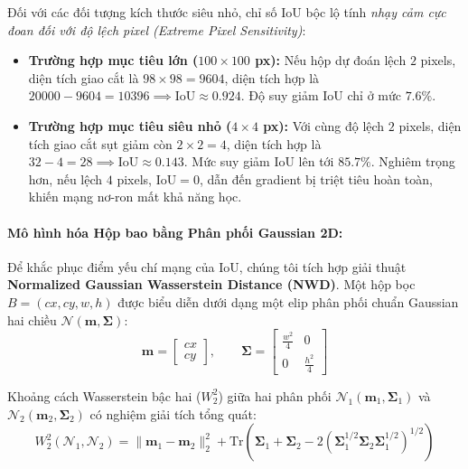 \documentclass[11pt,a4paper]{article}
\begin{document}
Đối với các đối tượng kích thước siêu nhỏ, chỉ số IoU bộc lộ tính \textit{nhạy cảm cực đoan đối với độ lệch pixel (Extreme Pixel Sensitivity)}:
\begin{itemize}
    \item \textbf{Trường hợp mục tiêu lớn ($100 \times 100$ px):} Nếu hộp dự đoán lệch $2$ pixels, diện tích giao cắt là $98 \times 98 = 9604$, diện tích hợp là $20000 - 9604 = 10396 \implies \text{IoU} \approx 0.924$. Độ suy giảm IoU chỉ ở mức $7.6\%$.
    \item \textbf{Trường hợp mục tiêu siêu nhỏ ($4 \times 4$ px):} Với cùng độ lệch $2$ pixels, diện tích giao cắt sụt giảm còn $2 \times 2 = 4$, diện tích hợp là $32 - 4 = 28 \implies \text{IoU} \approx 0.143$. Mức suy giảm IoU lên tới $85.7\%$. Nghiêm trọng hơn, nếu lệch $4$ pixels, $\text{IoU} = 0$, dẫn đến gradient bị triệt tiêu hoàn toàn, khiến mạng nơ-ron mất khả năng học.
\end{itemize}

\paragraph{Mô hình hóa Hộp bao bằng Phân phối Gaussian 2D:}
Để khắc phục điểm yếu chí mạng của IoU, chúng tôi tích hợp giải thuật \textbf{Normalized Gaussian Wasserstein Distance (NWD)}. Một hộp bọc $B = (cx, cy, w, h)$ được biểu diễn dưới dạng một elip phân phối chuẩn Gaussian hai chiều $\mathcal{N}(\mathbf{m}, \mathbf{\Sigma})$:
\begin{equation}
    \mathbf{m} = \begin{bmatrix} cx \\ cy \end{bmatrix}, \qquad \mathbf{\Sigma} = \begin{bmatrix} \frac{w^2}{4} & 0 \\ 0 & \frac{h^2}{4} \end{bmatrix}
\end{equation}

Khoảng cách Wasserstein bậc hai ($W_2^2$) giữa hai phân phối $\mathcal{N}_1(\mathbf{m}_1, \mathbf{\Sigma}_1)$ và $\mathcal{N}_2(\mathbf{m}_2, \mathbf{\Sigma}_2)$ có nghiệm giải tích tổng quát:
\begin{equation}
    W_2^2(\mathcal{N}_1, \mathcal{N}_2) = \|\mathbf{m}_1 - \mathbf{m}_2\|_2^2 + \text{Tr}\left(\mathbf{\Sigma}_1 + \mathbf{\Sigma}_2 - 2\left(\mathbf{\Sigma}_1^{1/2} \mathbf{\Sigma}_2 \mathbf{\Sigma}_1^{1/2}\right)^{1/2}\right)
\end{equation}
\end{document}
